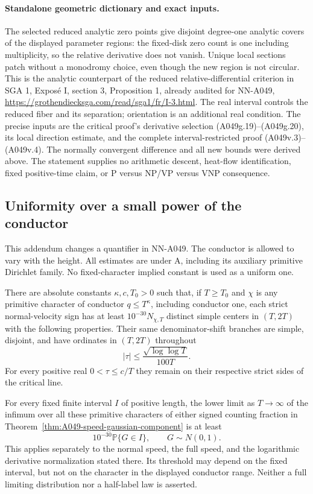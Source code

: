 \paragraph{Standalone geometric dictionary and exact inputs.}
The selected reduced analytic zero points give disjoint degree-one
analytic covers of the displayed parameter regions: the fixed-disk
zero count is one including multiplicity, so the relative derivative
does not vanish. Unique local sections patch without a monodromy
choice, even though the new region is not circular. This is the
analytic counterpart of the reduced relative-differential criterion
in SGA 1, Expos\'e I, section 3, Proposition 1, already audited for
NN-A049, \url{https://grothendiecksga.com/read/sga1/fr/I-3.html}.
The real interval controls the reduced fiber and its separation;
orientation is an additional real condition. The precise inputs are
the critical proof's derivative selection (A049g.19)--(A049g.20),
its local direction estimate, and the complete interval-restricted
proof (A049v.3)--(A049v.4). The normally convergent difference and
all new bounds were derived above. The statement supplies no
arithmetic descent, heat-flow identification, fixed positive-time
claim, or P versus NP/VP versus VNP consequence.


\subsection*{Uniformity over a small power of the conductor}

This addendum changes a quantifier in NN-A049. The conductor is
allowed to vary with the height. All estimates are under A, including
its auxiliary primitive Dirichlet family. No fixed-character implied
constant is used as a uniform one.

\begin{theorem}
\label{thm:A049-uniform-conductor}
There are absolute constants $\kappa,c,T_0>0$ such that, if $T\ge T_0$
and $\chi$ is any primitive character of conductor $q\le T^\kappa$,
including conductor one, each strict normal-velocity sign has at
least $10^{-30}N_{\chi,T}$ distinct simple centers in $(T,2T)$
with the following properties. Their same denominator-shift branches
are simple, disjoint, and have ordinates in $(T,2T)$ throughout
\[
                  |\tau|\le\frac{\sqrt{\log\log T}}{100T}.
\tag{A049u.1}
\]
For every positive real $0<\tau\le c/T$ they remain on their
respective strict sides of the critical line.

For every fixed finite interval $I$ of positive length, the lower
limit as $T\to\infty$ of the infimum over all these primitive
characters of either signed counting fraction in
Theorem~\ref{thm:A049-speed-gaussian-component} is at least
\[
                      10^{-30}\mathbb P\{G\in I\},
                         \qquad G\sim N(0,1).
\tag{A049u.2}
\]
This applies separately to the normal speed, the full speed, and
the logarithmic derivative normalization stated there. Its threshold
may depend on the fixed interval, but not on the character in the
displayed conductor range. Neither a full limiting distribution
nor a half-label law is asserted.
\end{theorem}

